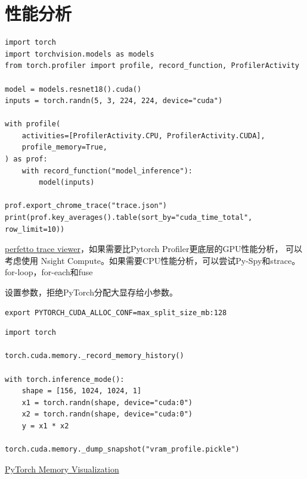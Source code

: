 \section{性能分析}
\begin{code}
\begin{verbatim}
import torch
import torchvision.models as models
from torch.profiler import profile, record_function, ProfilerActivity

model = models.resnet18().cuda()
inputs = torch.randn(5, 3, 224, 224, device="cuda")

with profile(
    activities=[ProfilerActivity.CPU, ProfilerActivity.CUDA],
    profile_memory=True,
) as prof:
    with record_function("model_inference"):
        model(inputs)

prof.export_chrome_trace("trace.json")
print(prof.key_averages().table(sort_by="cuda_time_total", row_limit=10))
\end{verbatim}
\end{code}

\href{https://ui.perfetto.dev}{perfetto trace viewer}，如果需要比Pytorch Profiler更底层的GPU性能分析，
可以考虑使用 Nsight Compute。如果需要CPU性能分析，可以尝试Py-Spy和strace。for-loop，for-each和fuse

设置参数，拒绝PyTorch分配大显存给小参数。
\begin{code}
\begin{verbatim}
export PYTORCH_CUDA_ALLOC_CONF=max_split_size_mb:128
\end{verbatim}
\end{code}

\begin{code}
\begin{verbatim}
import torch

torch.cuda.memory._record_memory_history()

with torch.inference_mode():
    shape = [156, 1024, 1024, 1]
    x1 = torch.randn(shape, device="cuda:0")
    x2 = torch.randn(shape, device="cuda:0")
    y = x1 * x2

torch.cuda.memory._dump_snapshot("vram_profile.pickle")
\end{verbatim}
\end{code}
\href{https://pytorch.org/memory_viz}{PyTorch Memory Visualization}